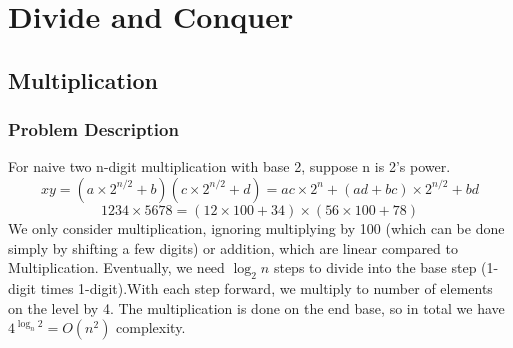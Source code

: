 \section{Divide and Conquer}
\subsection{Multiplication}
\subsubsection{Problem Description}
For naive two n-digit multiplication with base 2, suppose n is 2's power.
\[
    xy=(a\times 2^{n/2}+b)(c\times 2^{n/2}+d)=ac\times 2^n+(ad+bc)\times 2^{n/2}+bd
    \]
    \[
        1234\times5678=(12\times100+34)\times(56\times100+78) 
    \]
    We only consider multiplication, ignoring multiplying by 100 (which can be done simply by shifting a few digits) or addition, which are linear compared to Multiplication.
    Eventually, we need $\log_2 n$ steps to divide into the base step (1-digit times 1-digit).With each step forward, we multiply to number of elements on the level by 4. 
    The multiplication is done on the end base, so in total we have $4^{\log_n2}=O(n^2)$ complexity.
